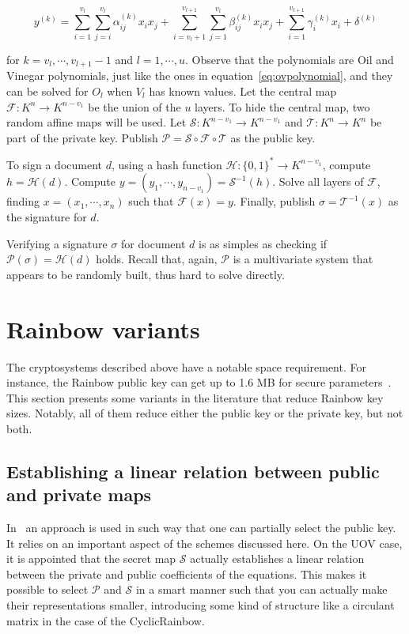 \documentclass{ufsctex/ufsctex}
\begin{document}
\begin{equation}
y^{(k)} =
\sum_{i=1}^{v_l}\sum_{j=i}^{v_l} \alpha^{(k)}_{ij} x_i x_j +
\sum_{i=v_l+1}^{v_{l+1}}\sum_{j=1}^{v_l} \beta^{(k)}_{ij} x_i x_j +
\sum_{i=1}^{v_{l+1}} \gamma^{(k)}_{i} x_i +
\delta^{(k)}
\end{equation}

for $k = v_l, \cdots, v_{l+1} - 1$ and $l = 1, \cdots, u$. Observe that the
polynomials are Oil and Vinegar polynomials, just like the ones in
equation~\ref{eq:ovpolynomial}, and they can be solved for $O_l$ when $V_l$ has
known values. Let the central map $\mathcal{F}:K^{n} \to K^{n-v_1}$ be the
union of the $u$ layers. To hide the central map, two random affine maps will
be used. Let $\mathcal{S}:K^{n-v_1} \to K^{n-v_1}$ and $\mathcal{T}:K^{n} \to
K^{n}$ be part of the private key. Publish $\mathcal{P} = \mathcal{S} \circ
\mathcal{F} \circ \mathcal{T}$ as the public key.

To sign a document $d$, using a hash function $\mathcal{H}: \{0,1\}^* \to
K^{n-v_1}$, compute $h = \mathcal{H}(d)$. Compute $y = (y_1, \cdots, y_{n-v_1})
= \mathcal{S}^{-1}(h)$. Solve all layers of $\mathcal{F}$, finding $x = (x_1,
\cdots, x_n)$ such that $\mathcal{F}(x) = y$. Finally, publish $\sigma =
\mathcal{T}^{-1}(x)$ as the signature for $d$.

Verifying a signature $\sigma$ for document $d$ is as simples as checking if
$\mathcal{P}(\sigma) = \mathcal{H}(d)$ holds. Recall that, again, $\mathcal{P}$
is a multivariate system that appears to be randomly built, thus hard to solve
directly.

\section{Rainbow variants}

The cryptosystems described above have a notable space requirement. For
instance, the Rainbow public key can get up to 1.6 MB for secure
parameters~\cite{ding2017nist}. This section presents some variants in the
literature that reduce Rainbow key sizes. Notably, all of them reduce either
the public key or the private key, but not both.

\subsection{Establishing a linear relation between public and private maps}
\label{sec:relation}

In~\cite{petzoldt2010cyclicrainbow} an approach is used in such way that one
can partially select the public key. It relies on an important aspect of the
schemes discussed here. On the UOV case,
it is appointed that the secret map $\mathcal{S}$ actually establishes a linear
relation between the private and public coefficients of the equations. This
makes it possible to select $\mathcal{P}$ and $\mathcal{S}$ in a smart manner
such that you can actually make their representations smaller, introducing some
kind of structure like a circulant matrix in the case of the CyclicRainbow.
\end{document}
